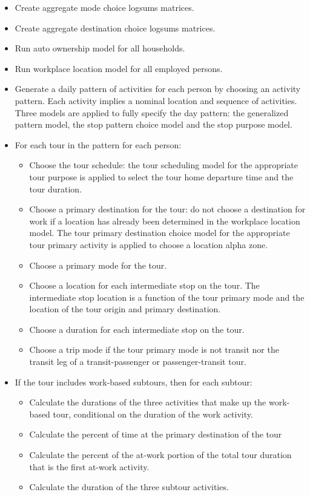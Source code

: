 \begin{itemize}
\item Create aggregate mode choice logsums matrices.
\item Create aggregate destination choice logsums matrices.
\item Run auto ownership model for all households.
\item Run workplace location model for all employed persons.
\item Generate a daily pattern of activities for each person by choosing an activity pattern. Each activity implies a nominal location and sequence of activities. Three models are applied to fully specify the day pattern: the generalized pattern model, the stop pattern choice model and the stop purpose model.
\item For each tour in the pattern for each person:
\begin{itemize}
\item Choose the tour schedule: the tour scheduling model for the appropriate tour purpose is applied to select the tour home departure time and the tour duration.
\item Choose a primary destination for the tour: do not choose a destination for work if a location has already been determined in the workplace location model. The tour primary destination choice model for the appropriate tour primary activity is applied to choose a location alpha zone.
\item Choose a primary mode for the tour.
\item Choose a location for each intermediate stop on the tour. The intermediate stop location is a function of the tour primary mode and the location of the tour origin and primary destination.
\item Choose a duration for each intermediate stop on the tour.
\item Choose a trip mode if the tour primary mode is not transit nor the transit leg of a transit-passenger or passenger-transit tour.
\end{itemize}
\item If the tour includes work-based subtours, then for each subtour:
\begin{itemize}
\item Calculate the durations of the three activities that make up the work-based tour, conditional on the duration of the work activity.
\item Calculate the percent of time at the primary destination of the tour
\item Calculate the percent of the at-work portion of the total tour duration that is the first at-work activity.
\item Calculate the duration of the three subtour activities.
\end{itemize}
\end{itemize}

